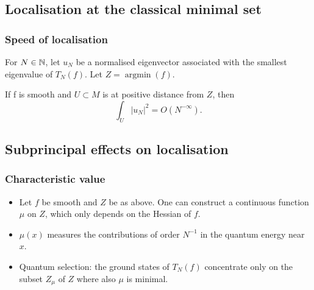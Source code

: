 \documentclass[mathserif]{beamer}
\begin{document}
\subsection{Localisation at the classical minimal set}
\begin{frame}
  \frametitle{Speed of localisation}
 For $N\in \mathbb{N}$, let $u_N$ be a normalised eigenvector associated with
 the smallest eigenvalue of $T_N(f)$. Let $Z=\mathop{argmin}(f)$.
  \begin{theorem}[{[Cha00]}]
  If f is {\color{myorange}smooth} and $U\subset M$ is at positive distance from $Z$, then \[\int_{U}|u_N|^2=O(N^{-\infty}).\]\vspace{-1.2em}
\end{theorem}
\end{frame}



\subsection{Subprincipal effects on localisation}
\begin{frame}
  \frametitle{Characteristic value}
  \begin{itemize}
  \item Let $f$ be smooth and $Z$ be as above. One can construct a continuous function $\mu$ on $Z$, which only depends on the Hessian of $f$.
    \item $\mu(x)$ measures the contributions of order $N^{-1}$ in the quantum
    energy near $x$.
  \item<2-> {\color{myorange} Quantum selection}: the ground states of $T_N(f)$
    concentrate only on the subset $Z_{\mu}$ of $Z$ where also $\mu$ is minimal.
  \end{itemize}
  

\end{frame}
\end{document}
